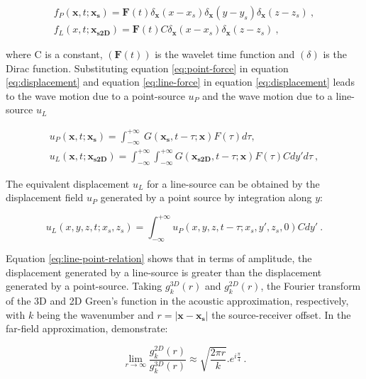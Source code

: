 \documentclass[paper,extra]{gji} %
\begin{document}
\begin{eqnarray} 
f_{P}(\mathbf{x},t;\mathbf{x_{s}})=\mathbf{F}(t)\delta_{\mathbf{x}}(x-x_{s})\delta_{\mathbf{x}}(y-y_{s})\delta_{\mathbf{x}}(z-z_{s})\ , \label{eq:point-force} \\
f_{L}(x,t;\mathbf{x_{s2D}})=\mathbf{F}(t) C \delta_{\mathbf{x}}(x-x_{s})\delta_{\mathbf{x}}(z-z_{s})\ , \label{eq:line-force}
\end{eqnarray}

\noindent where C is a constant, $(\mathbf{F}(t)) $ is the wavelet time function and $(\delta)$ is the Dirac function. Substituting equation \ref{eq:point-force} in equation \ref{eq:displacement} and equation \ref{eq:line-force} in equation \ref{eq:displacement} leads to the wave motion due to a point-source $u_{P}$ and the wave motion due to a line-source $u_{L}$ 

\begin{eqnarray}
u_{P}(\mathbf{x},t;\mathbf{x_{s}})=\int_{-\infty}^{+\infty}\ G(\mathbf{x_{s}},t-\tau;\mathbf{x})F(\tau)d\tau, \label{eq:point-displacement} \\
u_{L}(\mathbf{x},t;\mathbf{x_{s2D}})=\int_{-\infty}^{+\infty} \int_{-\infty}^{+\infty} G(\mathbf{x_{s2D}},t-\tau;\mathbf{x})F(\tau)Cdy'd\tau\ , \label{eq:line-displacement}
\end{eqnarray}

\noindent The equivalent displacement $u_{L}$ for a line-source can be obtained by the displacement field $u_{P}$ generated by a point source by integration along $y$:

\begin{equation}
u_{L}(x,y,z,t;x_{s},z_{s})=\int_{-\infty}^{+\infty}u_{P}(x,y,z,t-\tau;x_{s},y',z_{s},0)Cdy'\ .
\label{eq:line-point-relation}
\end{equation}

\noindent Equation \ref{eq:line-point-relation} shows that in terms of amplitude, the displacement generated by a line-source is greater than the displacement generated by a point-source.
\noindent Taking $g_{k}^{3D}(r)$ and $g_{k}^{2D}(r)$, the Fourier transform of the 3D and 2D Green's function in the acoustic approximation, respectively, with $k$ being the wavenumber and $r=|\mathbf{x}-\mathbf{x_{s}}|$ the source-receiver offset. In the far-field approximation, \citet{Forbriger_LSS_2014} demonstrate:

\begin{equation}
\lim\limits_{r \rightarrow \infty} \frac{g_{k}^{2D}(r)}{g_{k}^{3D}(r)}\approx \sqrt{\frac{2\pi r}{k}}.e^{i\frac{\pi}{4}}\ .
\label{eq:far-field-frac}
\end{equation}
\end{document}
